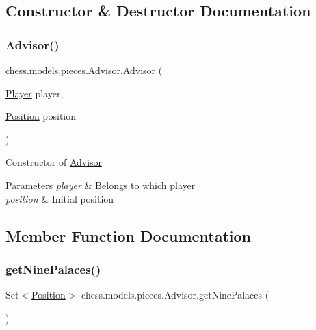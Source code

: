 \subsection{Constructor \& Destructor Documentation}
\mbox{\label{classchess_1_1models_1_1pieces_1_1_advisor_acad748f8b4188895b58996d0cef0a5d0}} 
\subsubsection{\texorpdfstring{Advisor()}{Advisor()}}
{\footnotesize\ttfamily chess.\+models.\+pieces.\+Advisor.\+Advisor (\begin{DoxyParamCaption}\item[{\mbox{\hyperlink{enumchess_1_1models_1_1enums_1_1_player}{Player}}}]{player,  }\item[{\mbox{\hyperlink{classchess_1_1models_1_1_position}{Position}}}]{position }\end{DoxyParamCaption})}

Constructor of \mbox{\hyperlink{classchess_1_1models_1_1pieces_1_1_advisor}{Advisor}}


\begin{DoxyParams}{Parameters}
{\em player} & Belongs to which player \\
\hline
{\em position} & Initial position \\
\hline
\end{DoxyParams}


\subsection{Member Function Documentation}
\mbox{\label{classchess_1_1models_1_1pieces_1_1_advisor_aec70114aea45fb0b4c102a81df30f60c}} 
\subsubsection{\texorpdfstring{get\+Nine\+Palaces()}{getNinePalaces()}}
{\footnotesize\ttfamily Set$<$\mbox{\hyperlink{classchess_1_1models_1_1_position}{Position}}$>$ chess.\+models.\+pieces.\+Advisor.\+get\+Nine\+Palaces (\begin{DoxyParamCaption}{ }\end{DoxyParamCaption})}

